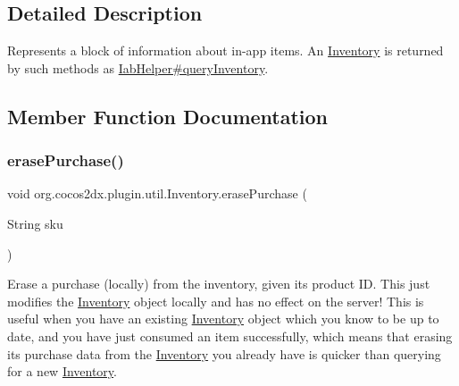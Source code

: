 \subsection{Detailed Description}
Represents a block of information about in-\/app items. An \hyperlink{classorg_1_1cocos2dx_1_1plugin_1_1util_1_1Inventory}{Inventory} is returned by such methods as \hyperlink{}{Iab\+Helper\#query\+Inventory}. 

\subsection{Member Function Documentation}
\mbox{\label{classorg_1_1cocos2dx_1_1plugin_1_1util_1_1Inventory_a74df7fe3843c49ac093af1fcca2ce86b}} 
\subsubsection{\texorpdfstring{erase\+Purchase()}{erasePurchase()}}
{\footnotesize\ttfamily void org.\+cocos2dx.\+plugin.\+util.\+Inventory.\+erase\+Purchase (\begin{DoxyParamCaption}\item[{String}]{sku }\end{DoxyParamCaption})\hspace{0.3cm}{\ttfamily [inline]}}

Erase a purchase (locally) from the inventory, given its product ID. This just modifies the \hyperlink{classorg_1_1cocos2dx_1_1plugin_1_1util_1_1Inventory}{Inventory} object locally and has no effect on the server! This is useful when you have an existing \hyperlink{classorg_1_1cocos2dx_1_1plugin_1_1util_1_1Inventory}{Inventory} object which you know to be up to date, and you have just consumed an item successfully, which means that erasing its purchase data from the \hyperlink{classorg_1_1cocos2dx_1_1plugin_1_1util_1_1Inventory}{Inventory} you already have is quicker than querying for a new \hyperlink{classorg_1_1cocos2dx_1_1plugin_1_1util_1_1Inventory}{Inventory}. \mbox{\label{classorg_1_1cocos2dx_1_1plugin_1_1util_1_1Inventory_a13b3181f29640855a9150998ac10db02}} 
